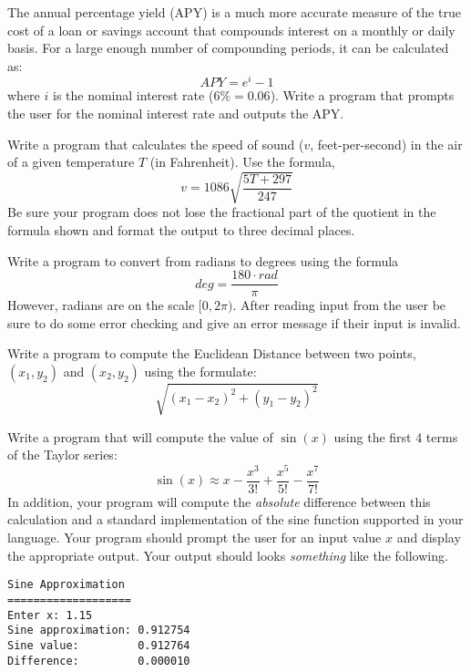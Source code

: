 \begin{exer}
The annual percentage yield (APY) is a much more accurate measure of the true cost of a 
loan or savings account that compounds interest on a monthly or daily basis.  For a large enough 
number of compounding periods, it can be calculated as:
 $$APY = e^{i} - 1$$
where $i$ is the nominal interest rate ($6\% = 0.06$).  Write a program that prompts the user 
for the nominal interest rate and outputs the APY.
\end{exer}

\begin{exer}
Write a program that calculates the speed of sound ($v$, feet-per-second) in the 
air of a given temperature $T$ (in Fahrenheit). Use the formula,
 $$v = 1086 \sqrt{\frac{5T + 297}{247}}$$
Be sure your program does not lose the fractional part of the quotient
in the formula shown and format the output to three decimal places.
\end{exer}

\begin{exer}
\label{exercise:radiansToDegree}
Write a program to convert from radians to degrees using the formula
  $$deg = \frac{180\cdot rad}{\pi}$$
However, radians are on the scale $[0, 2\pi)$.  After reading input
from the user be sure to do some error checking and give an error
message if their input is invalid.
\end{exer}

\begin{exer}
Write a program to compute the Euclidean Distance between two points, 
$(x_1, y_2)$ and $(x_2, y_2)$ using the formulate:
$$\sqrt{(x_1-x_2)^2+(y_1-y_2)^2}$$
\end{exer}

\begin{exer}
Write a program that will compute the value of $\sin(x)$ using the first 4 terms of 
the Taylor series:
  $$\sin(x) \approx x - \frac{x^3}{3!} + \frac{x^5}{5!} - \frac{x^7}{7!}$$
In addition, your program will compute the \emph{absolute} difference between this 
calculation and a standard implementation of the sine function supported in
your language.  Your program should prompt the user for an
input value $x$ and display the appropriate output.  Your output should looks \emph{something}
like the following.

\begin{verbatim}
Sine Approximation
===================
Enter x: 1.15
Sine approximation: 0.912754
Sine value:         0.912764
Difference:         0.000010
\end{verbatim}
\end{exer}


